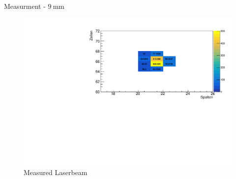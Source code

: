 \begin{frame}{ Measurment - $\SI{9}{\milli\meter}$ }

  \begin{figure}
    \centering
    \includegraphics[width=\textwidth]{./9_mm_measurment_plot.pdf}
    \caption{Measured Laserbeam }
    \label{ fig: 5_mm }
  \end{figure}

\end{frame}


